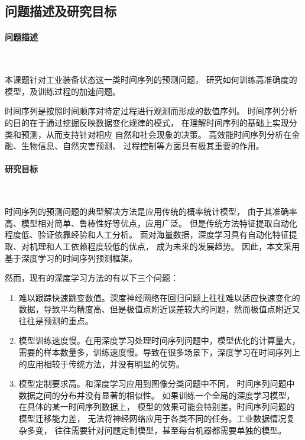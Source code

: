   \subsection{问题描述及研究目标}
  
  \paragraph{问题描述}~{}

  本课题针对工业装备状态这一类时间序列的预测问题，
  研究如何训练高准确度的模型，及训练过程的加速问题。

    时间序列是按照时间顺序对特定过程进行观测而形成的数值序列。
  时间序列分析的目的在于通过挖掘反映数据变化规律的模式，
  在理解时间序列的基础上实现分类和预测，从而支持针对相应
  自然和社会现象的决策。
  高效能时间序列分析在金融、生物信息、自然灾害预测、
  过程控制等方面具有极其重要的作用。

    
  \paragraph{研究目标}~{}\label{goal}

    时间序列的预测问题的典型解决方法是应用传统的概率统计模型，
    由于其准确率高、模型相对简单、鲁棒性好等优点，应用广泛。
    但是传统方法特征提取自动化程度低、验证依靠经验和人工分析。
    面对海量数据，深度学习具有自动化特征提取、对机理和人工依赖程度较低的优点，
    成为未来的发展趋势。
    因此，本文采用基于深度学习的时间序列预测框架。

    然而，现有的深度学习方法的有以下三个问题：
    \begin{enumerate}
      \item 难以跟踪快速跳变数值。深度神经网络在回归问题上往往难以适应快速变化的数据，导致平均精度高、但是极值点附近误差较大的问题，然而极值点附近又往往是预测的重点。
      \item 模型训练速度慢。在用深度学习处理时间序列问题中，模型优化的计算量大，需要的样本数量多，训练速度慢。导致在很多场景下，深度学习在时间序列上的应用相较于传统方法，并没有明显的优势。
      \item 模型定制要求高。和深度学习应用到图像分类问题中不同，
      时间序列问题中数据之间的分布并没有显著的相似性。
      如果训练一个全局的深度学习模型，在具体的某一时间序列数据上，
      模型的效果可能会特别差\cite{lebedev2018speeding}。时间序列问题的模型迁移能力差，
      无法将神经网络应用于各类不同的任务。工业数据情况复杂多变，
      往往需要针对问题定制模型，甚至每台机器都需要单独的模型。
    \end{enumerate}

